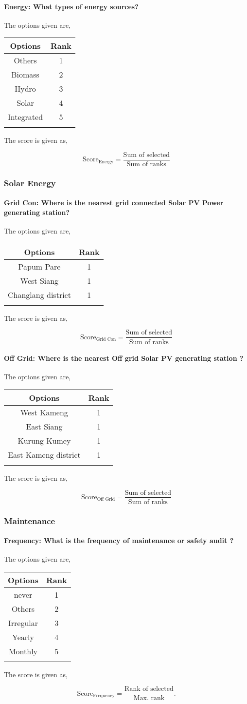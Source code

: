 \documentclass[oneside,twocolumn]{article}
\newcommand{\tsub}[2]{\text{#1}_{\text{#2}}}
\newcommand{\dsub}[2]{\dfrac{\text{#1}}{\text{#2}}}
\newcommand{\multsel}[1]
{
	\[
		\tsub{Score}{#1} = \dsub{Sum of selected}{Sum of ranks}
	\]
}
\newcommand{\singsel}[1]
{
	\[
		\tsub{Score}{#1} = \dsub{Rank of selected}{Max. rank}.
	\]
}
\newenvironment{ttable}
{
\begin{center}
\begin{tabular}{c|c}
\hline
}
{
\\ \hline
\end{tabular}
\end{center}
}
\begin{document}
\paragraph{Energy: What types of energy sources?}

The options given are,
\begin{ttable}
Options & Rank \\ \hline
Others & 1 \\
Biomass & 2 \\
Hydro & 3 \\
Solar & 4 \\
Integrated & 5 \\
\hline
\end{ttable}
The score is given as,
\multsel{Energy}
\subsubsection{Solar Energy}

\paragraph{Grid Con: Where is the nearest grid connected Solar PV Power generating station?}

The options given are,
\begin{ttable}
Options & Rank \\ \hline
Papum Pare & 1 \\
West Siang & 1 \\
Changlang district & 1 \\
\hline
\end{ttable}
The score is given as,
\multsel{Grid Con}
\paragraph{Off Grid: Where is the nearest Off grid Solar PV generating station ?}

The options given are,
\begin{ttable}
Options & Rank \\ \hline
  West Kameng & 1 \\
  East Siang & 1 \\
  Kurung Kumey & 1 \\
  East Kameng district & 1 \\
\hline
\end{ttable}
The score is given as,
\multsel{Off Grid}
\subsubsection{Maintenance}

\paragraph{Frequency: What is the frequency of  maintenance or safety audit ?}

The options given are,
\begin{ttable}
Options & Rank \\ \hline
never & 1 \\
Others & 2 \\
Irregular & 3 \\
Yearly & 4 \\
Monthly & 5 \\
\hline
\end{ttable}
The score is given as,
\singsel{Frequency}
\end{document}
